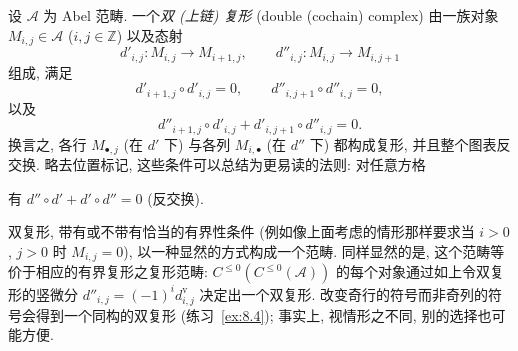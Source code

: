 \begin{definition}\label{def:8.5-double-complex}
设 $\mathcal{A}$ 为 Abel 范畴. 一个\emph{双 (上链) 复形} (double (cochain) complex) 由一族对象 $M_{i,j}\in\mathcal{A}$ ($i,j\in\mathbb{Z}$) 以及态射
\[
d'_{i,j}:M_{i,j}\to M_{i+1,j},\qquad d''_{i,j}:M_{i,j}\to M_{i,j+1}
\]
组成, 满足
\[
d'_{i+1,j}\circ d'_{i,j}=0,\qquad d''_{i,j+1}\circ d''_{i,j}=0,
\]
以及
\[
d''_{i+1,j}\circ d'_{i,j}+d'_{i,j+1}\circ d''_{i,j}=0.
\]
换言之, 各行 $M_{\bullet,j}$ (在 $d'$ 下) 与各列 $M_{i,\bullet}$ (在 $d''$ 下) 都构成复形, 并且整个图表反交换. 略去位置标记, 这些条件可以总结为更易读的法则: 对任意方格
\begin{center}
\end{center}
有 $d''\circ d'+d'\circ d''=0$ (反交换).
\end{definition}

双复形, 带有或不带有恰当的有界性条件 (例如像上面考虑的情形那样要求当 $i>0$, $j>0$ 时 $M_{i,j}=0$), 以一种显然的方式构成一个范畴. 同样显然的是, 这个范畴等价于相应的有界复形之复形范畴: $C^{\le 0}(C^{\le 0}(\mathcal{A}))$ 的每个对象通过如上令双复形的竖微分 $d''_{i,j}=(-1)^i d^{\mathrm v}_{i,j}$ 决定出一个双复形. 改变奇行的符号而非奇列的符号会得到一个同构的双复形 (练习~\ref{ex:8.4}); 事实上, 视情形之不同, 别的选择也可能方便.

